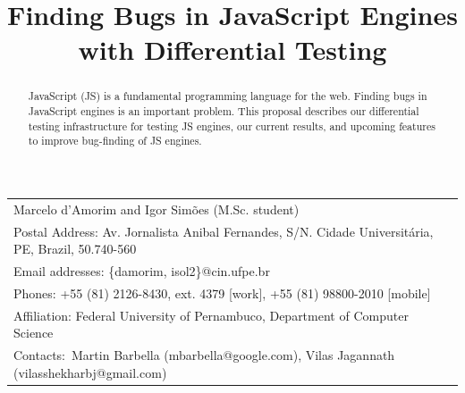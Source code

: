\documentclass[11pt]{article}
\begin{document}
\title{Finding Bugs in JavaScript Engines with Differential Testing}
\author{}
\date{}


\makeatletter
\def\maketitle{%
  \par{\centering\large\textbf{\@title}\normalsize\par}\vspace{3ex}%
  \par{\@author}%
  \par}
\makeatother

\maketitle

\vspace{-2ex}
\small    
\begin{table}[h!] 
  \centering%
  \begin{tabular*}{.85\linewidth}{l}

    Marcelo d'Amorim and Igor Sim\~oes (M.Sc. student)\\
    
    Postal Address: Av. Jornalista Anibal Fernandes, S/N. Cidade
    Universit\'aria, PE, Brazil, 50.740-560 \\
    
    Email addresses: \{damorim, isol2\}@cin.ufpe.br\\

    Phones: +55 (81) 2126-8430,
    ext. 4379 [work], +55 (81) 98800-2010 [mobile]\\

    Affiliation: Federal University of Pernambuco, Department of
    Computer Science\\

    Contacts:~Martin Barbella (mbarbella@google.com), Vilas Jagannath (vilasshekharbj@gmail.com)

  \end{tabular*}
\end{table}
\normalsize

\vspace{-2ex}
\begin{abstract}
JavaScript (JS) is a fundamental programming language for the
web. Finding bugs in JavaScript engines is an important problem. This
proposal describes our differential testing infrastructure for testing
JS engines, our current results, and upcoming features to improve
bug-finding of JS engines.
\end{abstract}
\end{document}

